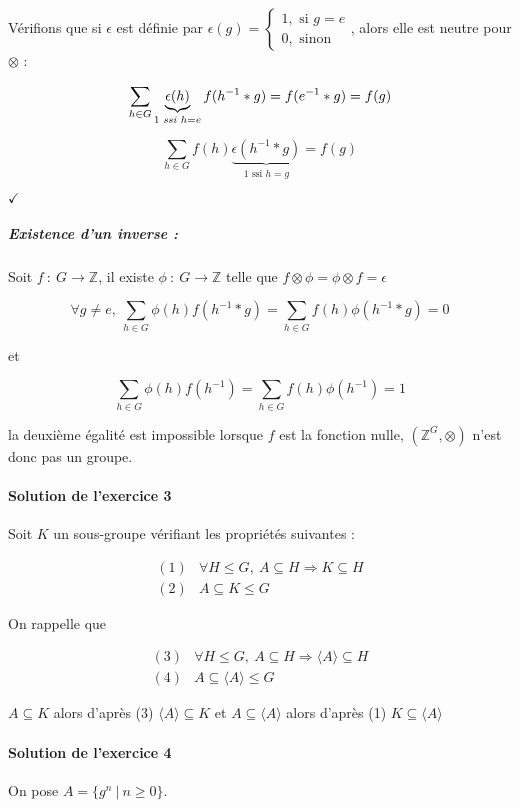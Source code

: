 \documentclass[]{article}
\theoremstyle{remark}
\theoremstyle{definition}
\newcommand{\checked}{
	\hfill$\checkmark$
}
\newcommand{\funcshort}[3]{
#1 ~ : ~ #2 \longrightarrow #3
}
\begin{document}
Vérifions que si $\epsilon$ est définie par $\epsilon(g) = \left\{
\begin{array}{l}
	1, \text{ si } g = e \\
	0, \text{ sinon}
\end{array}
\right.$, alors elle est neutre pour $\otimes$ :

$$\sum_{h \in G}\underbrace{\epsilon(h)}_{1 \text{ \textit{ssi} } h = e}f(h^{-1}*g) = f(e^{-1}*g) = f(g)$$

$$\sum_{h \in G}f(h)\underbrace{\epsilon(h^{-1}*g)}_{1 \text{ ssi } h = g}=f(g)$$

\checked

\subparagraph{Existence d'un inverse :}
Soit $\funcshort{f}{G}{\mathbb{Z}}$, il existe $\funcshort{\phi}{G}{\mathbb{Z}}$ telle que $f \otimes \phi = \phi \otimes f = \epsilon$

$$\forall g \neq e, ~ \sum_{h \in G}\phi(h)f(h^{-1}*g)=\sum_{h \in G}f(h)\phi(h^{-1}*g)=0$$

et

$$\sum_{h \in G}\phi(h)f(h^{-1})=\sum_{h \in G}f(h)\phi(h^{-1})=1$$

la deuxième égalité est impossible lorsque $f$ est la fonction nulle, $\left(\mathbb{Z}^G, \otimes\right)$ n'est donc pas un groupe.

\paragraph{Solution de l'exercice 3}
Soit $K$ un sous-groupe vérifiant les propriétés suivantes :

$$
	\begin{array}{lc}
		(1) & \forall H \leqslant G, ~ A \subseteq H \Longrightarrow K \subseteq H \\
		(2) & A \subseteq K \leqslant G
	\end{array}
$$

On rappelle que 

$$
	\begin{array}{lc}
		(3) & \forall H \leqslant G, ~ A \subseteq H \Longrightarrow \langle A \rangle \subseteq H \\
		(4) & A \subseteq \langle A \rangle \leqslant G
	\end{array}
$$

$A \subseteq K$ alors d'après (3) $\langle A \rangle \subseteq K$ et $A \subseteq \langle A \rangle$ alors d'après (1) $K \subseteq \langle A \rangle$

\paragraph{Solution de l'exercice 4}
On pose $A = \{g^n ~ | ~ n \geqslant 0\}$.
\end{document}
